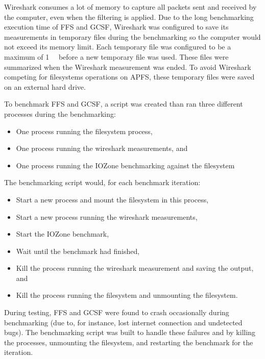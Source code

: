 Wireshark consumes a lot of memory to capture all packets sent and received by the computer, even when the filtering is applied. Due to the long benchmarking execution time of \gls{FFS} and \gls{GCSF}, Wireshark was configured to save its measurements in temporary files during the benchmarking so the computer would not exceed its memory limit. Each temporary file was configured to be a maximum of \SI{1}{\giga\byte} before a new temporary file was used. These files were summarized when the Wireshark measurement was ended. To avoid Wireshark competing for filesystems operations on \gls{APFS}, these temporary files were saved on an external hard drive.

To benchmark \gls{FFS} and \gls{GCSF}, a script was created than ran three different processes during the benchmarking:
\begin{itemize}
	\item One process running the filesystem process,
	\item One process running the wireshark measurements, and
	\item One process running the IOZone benchmarking against the filesystem
\end{itemize}
The benchmarking script would, for each benchmark iteration:
\begin{itemize}
	\item Start a new process and mount the filesystem in this process,
	\item Start a new process running the wireshark measurements,
	\item Start the IOZone benchmark,
	\item Wait until the benchmark had finished,
	\item Kill the process running the wireshark measurement and saving the output, and
	\item Kill the process running the filesystem and unmounting the filesystem.
\end{itemize}
During testing, \gls{FFS} and \gls{GCSF} were found to crash occasionally during benchmarking (due to, for instance, lost internet connection and undetected bugs). The benchmarking script was built to handle these failures and by killing the processes, unmounting the filesystem, and restarting the benchmark for the iteration. 

